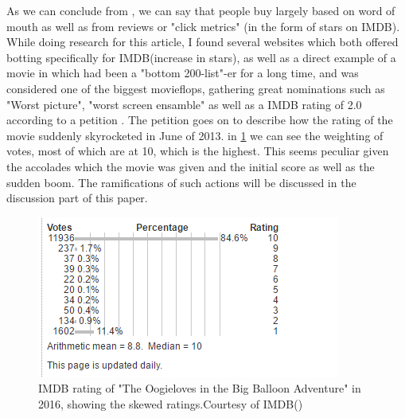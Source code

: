 \label{Emil:oogie}
As we can conclude from \cite{Bialecki2016}, we can say that people buy largely based on word of mouth as well as from reviews or "click metrics" (in the form of stars on IMDB). While doing research for this article, I found several websites which both offered botting specifically for IMDB(increase in stars), as well as a direct example of a movie in which had been a "bottom 200-list"-er for a long time, and was considered one of the biggest movieflops, gathering great nominations such as "Worst picture", "worst screen ensamble" \cite{emil:wiki:oogieacc} as well as a IMDB rating of 2.0 according to a petition \cite{Emil:change:Oogieloves}. The petition goes on to describe how the rating of the movie suddenly skyrocketed in June of 2013. in \ref{IMDB:rate} we can see the weighting of votes, most of which are at 10, which is the highest. This seems peculiar given the accolades which the movie was given and the initial score as well as the sudden boom. The ramifications of such actions will be discussed in the discussion part of this paper. 

\begin{figure}[h]\label{imdbratingCurve}
\centering
\includegraphics[scale=1]{fig/imdbstats.png}
\caption{IMDB rating of "The Oogieloves in the Big Balloon Adventure" in 2016, showing the skewed ratings.Courtesy of IMDB(\cite{emil:imdb:Oogieloves})}
\label{IMDB:rate}
\end{figure}


